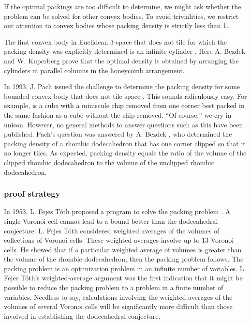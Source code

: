 If the optimal packings are too difficult to determine,
we might ask whether
the problem can be solved for other convex bodies.
To avoid trivialities, we restrict our attention to convex bodies
whose packing density is strictly less than 1.

  The first convex body in Euclidean 3-space that does not tile
for which the packing density was explicitly determined is
an infinite cylinder \cite{Bez90}.
Here A. Bezdek and W. Kuperberg prove
that the
optimal density is obtained by arranging the cylinders in
parallel columns in the honeycomb arrangement.

In 1993, J. Pach issued
the challenge to determine the packing density for some bounded convex
body that does not tile space \cite{MP93}.  This sounds ridiculously
easy.  For example, is a cube with a miniscule chip removed from one corner
best packed in the same fashion as a cube without the chip removed.
``Of course,'' we cry in unison.  However, no general methods to answer
questions such as this have been published.
Pach's question was answered by
A. Bezdek \cite{Bez94}, who determined the packing density of a rhombic
dodecahedron that has one corner clipped so that it no longer tiles.
As expected, packing density equals the ratio of the
volume of the clipped
rhombic dodecahedron to the volume of the unclipped rhombic dodecahedron.

\subsubsection{proof strategy}

In 1953, L. Fejes T\'oth proposed a program to solve the
packing problem \cite{Fej53}.
A single Voronoi cell cannot lead to a bound better
than the dodecahedral conjecture.   L. Fejes T\'oth considered
weighted averages of the volumes of collections of Voronoi cells.
 These weighted
averages involve up to $13$ Voronoi cells.  He showed that if a particular
weighted average of volumes is greater than the volume of the
rhombic dodecahedron, then the packing problem follows.
The packing problem is an optimization problem in an infinite
number of variables.  L. Fejes T\'oth's weighted-average argument
was the first indication that it might be possible to reduce
the packing problem to a problem in a finite number of variables.
Needless to say, calculations involving the weighted averages of the
volumes of
several Voronoi cells will be significantly more difficult than those
involved in establishing the dodecahedral conjecture.

